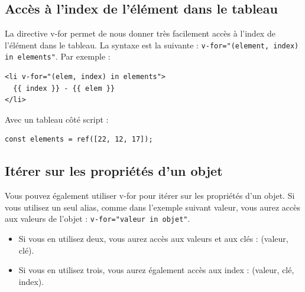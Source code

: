 \documentclass{article}
\begin{document}
\subsection{Accès à l'index de l'élément dans le tableau}
La directive {\color{monOrange}v-for} permet de nous donner très facilement accès à l'index de l'élément dans le tableau. La syntaxe est la suivante : {\tt v-for="(element, index) in elements"}. Par exemple :
\begin{verbatim}
<li v-for="(elem, index) in elements">
  {{ index }} - {{ elem }}
</li>
\end{verbatim}
Avec un tableau côté script :
\begin{verbatim}
const elements = ref([22, 12, 17]);
\end{verbatim}

\subsection{Itérer sur les propriétés d'un objet}
Vous pouvez également utiliser {\color{monOrange}v-for} pour itérer sur les propriétés d'un objet. Si vous utilisez un seul alias, comme dans l'exemple suivant {\color{monOrange}valeur}, vous aurez accès aux valeurs de l'objet : {\tt v-for="valeur in objet"}.
\begin{itemize}
\item Si vous en utilisez deux, vous aurez accès aux valeurs et aux clés : {\color{monOrange}(valeur, clé)}.
\item Si vous en utilisez trois, vous aurez également accès aux index : {\color{monOrange}(valeur, clé, index)}.
\end{itemize}
\end{document}
